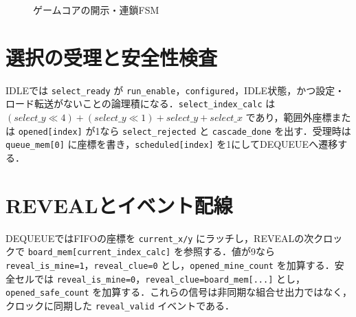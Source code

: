\begin{figure}[tb]
\centering
{}
\caption{ゲームコアの開示・連鎖FSM}
\label{fig:game-core-fsm}
\end{figure}

\section{選択の受理と安全性検査}
IDLEでは \texttt{select\_ready} が \texttt{run\_enable}，\texttt{configured}，IDLE状態，かつ設定・ロード転送がないことの論理積になる．\texttt{select\_index\_calc} は \((select\_y\ll4)+(select\_y\ll1)+select\_y+select\_x\) であり，範囲外座標または \texttt{opened[index]} が1なら \texttt{select\_rejected} と \texttt{cascade\_done} を出す．受理時は \texttt{queue\_mem[0]} に座標を書き，\texttt{scheduled[index]} を1にしてDEQUEUEへ遷移する．

\section{REVEALとイベント配線}
DEQUEUEではFIFOの座標を \texttt{current\_x/y} にラッチし，REVEALの次クロックで \texttt{board\_mem[current\_index\_calc]} を参照する．値が9なら \texttt{reveal\_is\_mine=1}，\texttt{reveal\_clue=0} とし，\texttt{opened\_mine\_count} を加算する．安全セルでは \texttt{reveal\_is\_mine=0}，\texttt{reveal\_clue=board\_mem[...]} とし，\texttt{opened\_safe\_count} を加算する．これらの信号は非同期な組合せ出力ではなく，クロックに同期した \texttt{reveal\_valid} イベントである．

